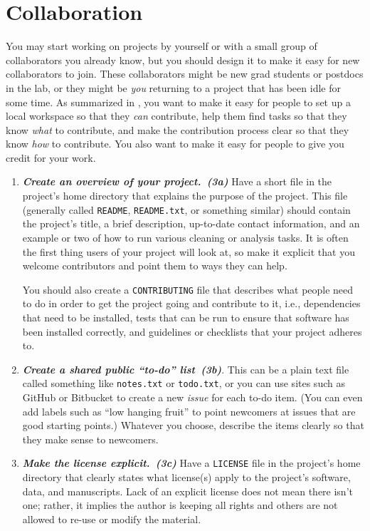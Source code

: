 \documentclass[10pt,letterpaper]{article}
\newcommand{\practicesection}[2]{\section{#1}\label{#2}}
\newcommand{\practice}[2]{\textbf{\emph{{#2}~({#1})}}}
\begin{document}
\practicesection{Collaboration}{sec:collaboration}

You may start working on projects by yourself or with a small group of
collaborators you already know, but you should design it to make it easy
for new collaborators to join. These collaborators might be new
grad students or postdocs in the lab, or they might be \emph{you}
returning to a project that has been idle for some time. As summarized
in \cite{steinmacher2015}, you want to make it easy for people to set up a
local workspace so that they \emph{can} contribute, help them find tasks
so that they know \emph{what} to contribute, and make the contribution
process clear so that they know \emph{how} to contribute.  You also want
to make it easy for people to give you credit for your work.

\begin{enumerate}

\item
  \practice{3a}{Create an overview of your project.}  Have a short
  file in the project's home directory that explains the
  purpose of the project.  This file (generally called
  \texttt{README}, \texttt{README.txt}, or something similar) should
  contain the project's title, a brief description, up-to-date contact
  information, and
  an example or two of how to run various cleaning or analysis tasks.  It is often
  the first thing users of your project will look at, so make it
  explicit that you welcome contributors and point them to ways they
  can help.

  You should also create a \texttt{CONTRIBUTING} file that describes
  what people need to do in order to get the project going and
  contribute to it, i.e., dependencies that need to be installed,
  tests that can be run to ensure that software has been installed
  correctly, and guidelines or checklists that your project adheres
  to.

\item
  \practice{3b}{Create a shared public ``to-do'' list}.  This can be a
  plain text file called something like \texttt{notes.txt} or
  \texttt{todo.txt}, or you can use sites such as GitHub or Bitbucket
  to create a new \emph{issue} for each to-do item. (You can even add
  labels such as ``low hanging fruit'' to point newcomers at issues
  that are good starting points.)  Whatever you choose, describe the
  items clearly so that they make sense to newcomers.

\item
  \practice{3c}{Make the license explicit.}  Have a \texttt{LICENSE} file
  in the project's home directory that clearly states what license(s)
  apply to the project's software, data, and manuscripts. Lack of an
  explicit license does not mean there isn't one; rather, it implies
  the author is keeping all rights and others are not allowed to
  re-use or modify the material.


\end{enumerate}
\end{document}
